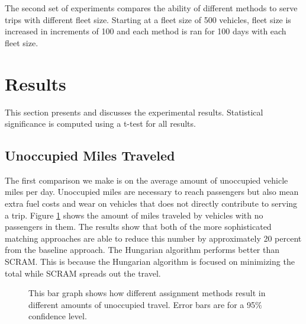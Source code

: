 \documentclass[letterpaper]{article}
\begin{document}
The second set of experiments compares the ability of different methods to serve trips with different fleet size. Starting at a fleet size of 500 vehicles, fleet size is increased in increments of 100 and each method is ran for 100 days with each fleet size.

\section{Results}

This section presents and discusses the experimental results. Statistical significance is computed using a t-test for all results.

\subsection{Unoccupied Miles Traveled}

The first comparison we make is on the average amount of unoccupied vehicle miles per day. Unoccupied miles are necessary to reach passengers but also mean extra fuel costs and wear on vehicles that does not directly contribute to serving a trip. Figure \ref{unoccupiedGraph} shows the amount of miles traveled by vehicles with no passengers in them. The results show that both of the more sophisticated matching approaches are able to reduce this number by approximately 20 percent from the baseline approach. The Hungarian algorithm performs better than SCRAM. This is because the Hungarian algorithm is focused on minimizing the total while SCRAM spreads out the travel.  

\begin{figure}

\label{unoccupiedGraph}
\caption{This bar graph shows how different assignment methods result in different amounts of unoccupied travel. Error bars are for a 95$\%$ confidence level.}
\end{figure}
\end{document}
